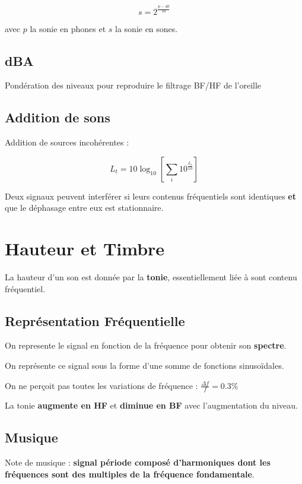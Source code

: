 \documentclass[a4paper, 11pt]{article}
\begin{document}
    $$s = 2^\frac{p-40}{10}$$

    avec $p$ la sonie en phones et $s$ la sonie en sones.

    \subsection{dBA}

    Pondération des niveaux pour reproduire le filtrage BF/HF de l'oreille

    \subsection{Addition de sons}

    Addition de sources incohérentes :

    $$L_t = 10\log_{10}\left[\sum_i10^{\frac{L_i}{10}}\right]$$

    Deux signaux peuvent interférer si leurs contenus fréquentiels sont identiques {\bf et} que le déphasage entre eux est stationnaire.

    \section{Hauteur et Timbre}

    La hauteur d'un son est donnée par la {\bf tonie}, essentiellement liée à sont contenu fréquentiel.

    \subsection{Représentation Fréquentielle}

    On represente le signal en fonction de la fréquence pour obtenir son {\bf spectre}.

    On représente ce signal sous la forme d'une somme de fonctions sinusoïdales.

    On ne perçoit pas toutes les variations de fréquence : $\frac{\Delta f}{f} = 0.3\%$

    La tonie {\bf augmente en HF} et {\bf diminue en BF} avec l'augmentation du niveau.

    \subsection{Musique}

    Note de musique : {\bf signal période composé d'harmoniques dont les fréquences sont des multiples de la fréquence fondamentale}.
\end{document}

